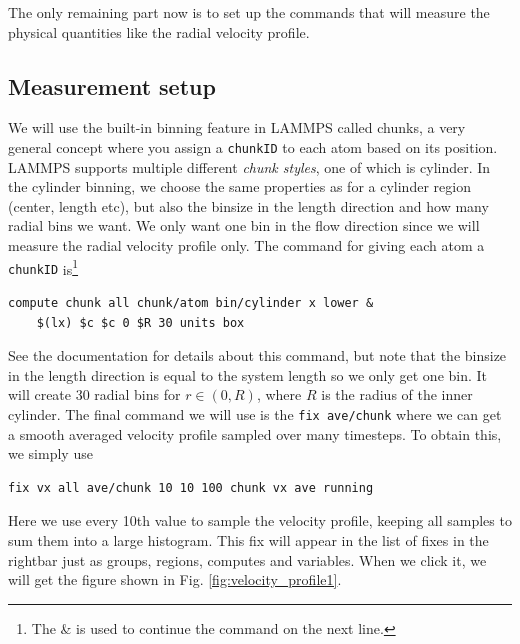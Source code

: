 \documentclass[aps,pre,twocolumn,letterpaper,floatfix,nofootinbib]{revtex4}
\newcommand{\code}[1]{\colorbox{light-gray}{\color{RawSienna}\texttt{#1}}}
\begin{document}
The only remaining part now is to set up the commands that will measure the physical quantities like the radial velocity profile.

\subsection{Measurement setup}
We will use the built-in binning feature in LAMMPS called chunks, a very general concept where you assign a \code{chunkID} to each atom
based on its position. LAMMPS supports multiple different \textit{chunk styles}, one of which is cylinder.
In the cylinder binning, we choose the same properties as for a cylinder region (center, length etc), but also the binsize in the length direction and how many radial bins we want.
We only want one bin in the flow direction since we will measure the radial velocity profile only.
The command for giving each atom a \code{chunkID} is\footnote{The \& is used to continue the command on the next line.}
\begin{lstlisting}[basicstyle=\tiny, frame = none, numbers=none, framexleftmargin=0pt, xleftmargin=-0.75cm, xrightmargin=0.0cm]
	compute chunk all chunk/atom bin/cylinder x lower &
	$(lx) $c $c 0 $R 30 units box
\end{lstlisting}
See the documentation for details about this command, but note that the binsize in the length direction is equal to the system length so we only get one bin.
It will create 30 radial bins for $r\in (0, R)$, where $R$ is the radius of the inner cylinder.
The final command we will use is the \code{fix ave/chunk} where we can get a smooth averaged velocity profile sampled over many timesteps.
To obtain this, we simply use
\begin{lstlisting}[basicstyle=\tiny, frame = none, numbers=none, framexleftmargin=0pt, xleftmargin=-0.75cm, xrightmargin=0.0cm]
	fix vx all ave/chunk 10 10 100 chunk vx ave running
\end{lstlisting}
Here we use every 10th value to sample the velocity profile, keeping all samples to sum them into a large histogram.
This fix will appear in the list of fixes in the rightbar just as groups, regions, computes and variables.
When we click it, we will get the figure shown in Fig. \ref{fig:velocity_profile1}.
\end{document}
